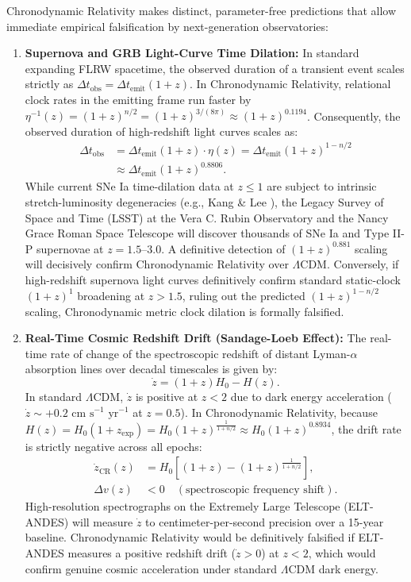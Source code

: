 \documentclass[aps,prd,reprint,superscriptaddress,nofootinbib,floatfix,amsmath,amssymb]{revtex4-2}
\begin{document}
Chronodynamic Relativity makes distinct, parameter-free predictions that allow immediate empirical falsification by next-generation observatories:
\begin{enumerate}
    \item \textbf{Supernova and GRB Light-Curve Time Dilation:} In standard expanding FLRW spacetime, the observed duration of a transient event scales strictly as $\Delta t_{\text{obs}} = \Delta t_{\text{emit}} (1+z)$. In Chronodynamic Relativity, relational clock rates in the emitting frame run faster by $\eta^{-1}(z) = (1+z)^{n/2} = (1+z)^{3/(8\pi)} \approx (1+z)^{0.1194}$. Consequently, the observed duration of high-redshift light curves scales as:
    \begin{align}
    \Delta t_{\text{obs}} &= \Delta t_{\text{emit}} (1+z) \cdot \eta(z) = \Delta t_{\text{emit}} (1+z)^{1 - n/2} \nonumber \\
    &\approx \Delta t_{\text{emit}} (1+z)^{0.8806}.
    \label{eq:time_dilation_test}
    \end{align}
    While current SNe Ia time-dilation data at $z \le 1$ are subject to intrinsic stretch-luminosity degeneracies (e.g., Kang \& Lee \cite{KangLee2020}), the Legacy Survey of Space and Time (LSST) at the Vera C. Rubin Observatory and the Nancy Grace Roman Space Telescope will discover thousands of SNe Ia and Type II-P supernovae at $z = 1.5\text{--}3.0$. A definitive detection of $(1+z)^{0.881}$ scaling will decisively confirm Chronodynamic Relativity over $\Lambda\text{CDM}$. Conversely, if high-redshift supernova light curves definitively confirm standard static-clock $(1+z)^1$ broadening at $z > 1.5$, ruling out the predicted $(1+z)^{1 - n/2}$ scaling, Chronodynamic metric clock dilation is formally falsified.
    \item \textbf{Real-Time Cosmic Redshift Drift (Sandage-Loeb Effect):} The real-time rate of change of the spectroscopic redshift of distant Lyman-$\alpha$ absorption lines over decadal timescales is given by:
    \begin{equation}
    \dot{z} = (1+z) H_0 - H(z).
    \end{equation}
    In standard $\Lambda\text{CDM}$, $\dot{z}$ is positive at $z < 2$ due to dark energy acceleration ($\dot{z} \sim +0.2\text{ cm s}^{-1}\text{ yr}^{-1}$ at $z = 0.5$). In Chronodynamic Relativity, because $H(z) = H_0 (1+z_{\text{exp}}) = H_0 (1+z)^{\frac{1}{1+n/2}} \approx H_0 (1+z)^{0.8934}$, the drift rate is strictly negative across all epochs:
    \begin{align}
    \dot{z}_{\text{CR}}(z) &= H_0 \left[ (1+z) - (1+z)^{\frac{1}{1+n/2}} \right], \label{eq:redshift_drift} \\
    \Delta v(z) &< 0 \quad (\text{spectroscopic frequency shift}). \nonumber
    \end{align}
    High-resolution spectrographs on the Extremely Large Telescope (ELT-ANDES) will measure $\dot{z}$ to centimeter-per-second precision over a 15-year baseline. Chronodynamic Relativity would be definitively falsified if ELT-ANDES measures a positive redshift drift ($\dot{z} > 0$) at $z < 2$, which would confirm genuine cosmic acceleration under standard $\Lambda\text{CDM}$ dark energy.
\end{enumerate}
\end{document}

